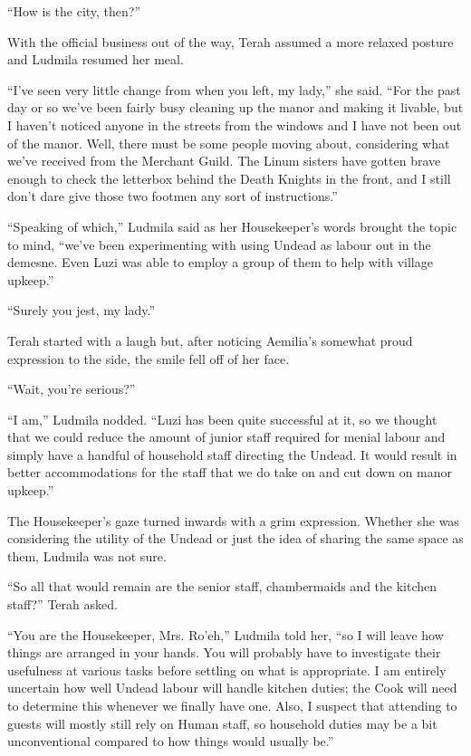  

“How is the city, then?”

 

With the official business out of the way, Terah assumed a more relaxed posture and Ludmila resumed her meal.

 

“I’ve seen very little change from when you left, my lady,” she said. “For the past day or so we’ve been fairly busy cleaning up the manor and making it livable, but I haven’t noticed anyone in the streets from the windows and I have not been out of the manor. Well, there must be some people moving about, considering what we’ve received from the Merchant Guild. The Linum sisters have gotten brave enough to check the letterbox behind the Death Knights in the front, and I still don’t dare give those two footmen any sort of instructions.”

 

“Speaking of which,” Ludmila said as her Housekeeper’s words brought the topic to mind, “we’ve been experimenting with using Undead as labour out in the demesne. Even Luzi was able to employ a group of them to help with village upkeep.”

 

“Surely you jest, my lady.”

 

Terah started with a laugh but, after noticing Aemilia’s somewhat proud expression to the side, the smile fell off of her face.

 

“Wait, you’re serious?”

 

“I am,” Ludmila nodded. “Luzi has been quite successful at it, so we thought that we could reduce the amount of junior staff required for menial labour and simply have a handful of household staff directing the Undead. It would result in better accommodations for the staff that we do take on and cut down on manor upkeep.”

 

The Housekeeper’s gaze turned inwards with a grim expression. Whether she was considering the utility of the Undead or just the idea of sharing the same space as them, Ludmila was not sure.

 

“So all that would remain are the senior staff, chambermaids and the kitchen staff?” Terah asked.

 

“You are the Housekeeper, Mrs. Ro’eh,” Ludmila told her, “so I will leave how things are arranged in your hands. You will probably have to investigate their usefulness at various tasks before settling on what is appropriate. I am entirely uncertain how well Undead labour will handle kitchen duties; the Cook will need to determine this whenever we finally have one. Also, I suspect that attending to guests will mostly still rely on Human staff, so household duties may be a bit unconventional compared to how things would usually be.”

